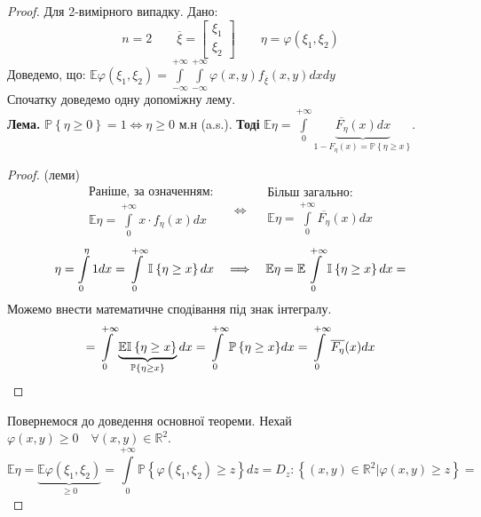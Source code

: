 \begin{proof}
   Для 2-вимірного випадку. Дано:
   $$
   n=2 \qquad \overline{\xi}= \begin{bmatrix}
    \xi_1 \\
    \xi_2
   \end{bmatrix} \qquad \eta = \varphi(\xi_1 , \xi_2)
   $$
   Доведемо, що: $\mathbb{E} \varphi (\xi_1, \xi_2) =  \int\limits_{- \infty}^{ +\infty}{  \int\limits_{-\infty}^{ +\infty}{
   \varphi(x,y) f_{\overline{\xi}} (x,y)dxdy
   }}$\\
   Спочатку доведемо одну допоміжну лему.\\
   \textbf{Лема. } $\mathbb{P} \left\lbrace \eta \geq 0 \right\rbrace = 1 \Longleftrightarrow \eta \geq 0$ м.н (a.s.). \textbf{Тоді }
   $\mathbb{E} \eta  =  \displaystyle\int\limits_{0}^{ +\infty}{\underbrace{\overline{F_\eta} (x) dx}_{1 - F_\eta (x) = \mathbb{P} \left\lbrace \eta \geq x \right\rbrace}}$.
   \begin{proof} (леми)
   $$
   \begin{gathered}
    \text{Раніше, за означенням:}\\
     \mathbb{E} \eta =  \int\limits_{0}^{ +\infty}{x \cdot f_{\eta} (x) dx }
   \end{gathered} \quad \Longleftrightarrow \quad
   \begin{gathered}
    \text{Більш загально:}\\
     \mathbb{E} \eta  =  \int\limits_{0}^{ +\infty}{\overline{F_\eta} (x) dx}
   \end{gathered}
   $$
   $$
   \eta =  \int\limits_{0}^{\eta}{1 dx} =  \int\limits_{0}^{ +\infty}{ \mathbb{I}_{}\left\lbrace \eta \geq x \right\rbrace dx}
\quad \Longrightarrow \quad
\mathbb{E} \eta = \mathbb{E} \int\limits_{0}^{ +\infty}{ \mathbb{I}_{}\left\lbrace \eta \geq x \right\rbrace dx} =
   $$
   Можемо внести математичне сподівання під знак інтегралу.
   $$
   =  \int\limits_{0}^{ +\infty}{\underbrace{ \mathbb{E}\mathbb{I}_{}\left\lbrace \eta \geq x \right\rbrace}_{ \mathbb{P} \left\lbrace \eta \geq x \right\rbrace} dx} =  \int\limits_{0}^{ +\infty}{ \mathbb{P} \left\lbrace \eta \geq x \right\rbrace} dx =  \int\limits_{0}^{ +\infty}{\overline{F_\eta} (x) dx}
   $$
   \end{proof}
   Повернемося до доведення основної теореми. Нехай $ \varphi(x,y) \geq 0 \quad \forall (x,y) \in \mathbb{R}^2.$
   $$
   \mathbb{E} \eta = \underbrace{\mathbb{E} \varphi (\xi_1, \xi_2)}_{ \geq 0 } =  \int\limits_{0}^{ +\infty}{\mathbb{P} \left\lbrace \varphi(\xi_1, \xi_2) \geq z  \right\rbrace dz} =
     D_z : \left\lbrace (x,y) \in \mathbb{R}^2 \big| \varphi(x,y) \geq z \right\rbrace =
$$
\end{proof}
